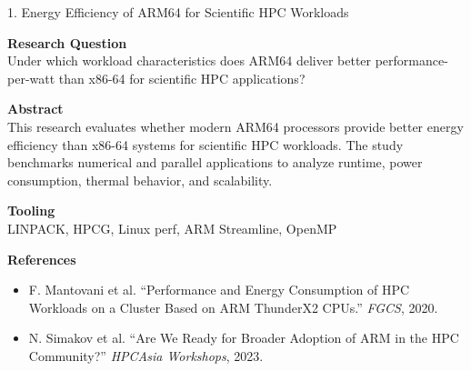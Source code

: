 \documentclass[aspectratio=169]{beamer}
\begin{document}
\begin{frame}{1. Energy Efficiency of ARM64 for Scientific HPC Workloads}
\small

\textbf{Research Question}\\
Under which workload characteristics does ARM64 deliver better performance-per-watt than x86-64 for scientific HPC applications?

\vspace{0.3em}

\textbf{Abstract}\\
This research evaluates whether modern ARM64 processors provide better energy efficiency than x86-64 systems for scientific HPC workloads. The study benchmarks numerical and parallel applications to analyze runtime, power consumption, thermal behavior, and scalability.

\vspace{0.3em}

\textbf{Tooling}\\
LINPACK, HPCG, Linux perf, ARM Streamline, OpenMP

\vspace{0.3em}

\textbf{References}
\begin{itemize}
\item F. Mantovani et al. ``Performance and Energy Consumption of HPC Workloads on a Cluster Based on ARM ThunderX2 CPUs.'' \emph{FGCS}, 2020.

\item N. Simakov et al. ``Are We Ready for Broader Adoption of ARM in the HPC Community?'' \emph{HPCAsia Workshops}, 2023.
\end{itemize}

\end{frame}

\end{document}
